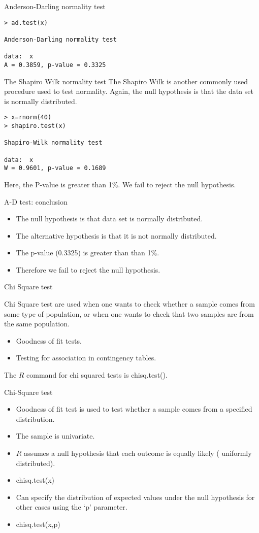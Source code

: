 {Anderson-Darling normality test}
\begin{verbatim}
> ad.test(x)

Anderson-Darling normality test

data:  x
A = 0.3859, p-value = 0.3325
\end{verbatim}


{The Shapiro Wilk normality test}
The Shapiro Wilk is another commonly used procedure used to test normality.
Again, the null hypothesis is that the data set is normally distributed.
\begin{verbatim}
> x=rnorm(40)
> shapiro.test(x)

Shapiro-Wilk normality test

data:  x
W = 0.9601, p-value = 0.1689
\end{verbatim}
Here, the P-value is greater than 1\%. We fail to reject the null hypothesis.


{A-D test: conclusion}
\begin{itemize}
	\item The null hypothesis is that data set is normally distributed.
	\item The alternative hypothesis is that it is not normally distributed.
	\item The p-value (0.3325) is greater than than 1\%.
	\item Therefore we fail to reject the null hypothesis.
\end{itemize}


{Chi Square test}

Chi Square test are used when one wants to check whether a sample comes from some type of population,
or when one wants to check that two samples are from the same population.

\begin{itemize}
	\item Goodness of fit tests.
	\item Testing for association in contingency tables.
\end{itemize}

The $R$ command for chi squared tests is chisq.test().



{Chi-Square test}
\begin{itemize}
	\item Goodness of fit test is used to test whether a sample comes from a specified distribution.
	\item The sample is univariate.
	\item $R$ assumes a null hypothesis that each outcome is equally likely ( uniformly distributed).
	\item chisq.test(x)
	\item Can specify the distribution of expected values under the null hypothesis for other cases using the `p' parameter.
	\item chisq.test(x,p)
\end{itemize}

